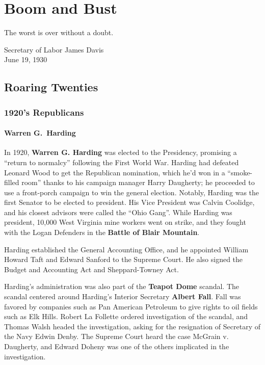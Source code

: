 \chapter{Boom and Bust}

\epigraph{%
  The worst is over without a doubt.
}{Secretary of Labor James Davis \\ June 19, 1930}

\section{Roaring Twenties}

\subsection*{1920's Republicans}

\subsubsection*{Warren G.\ Harding}

In 1920, \textbf{Warren G. Harding} was elected to the Presidency,
promising a ``return to normalcy'' following the First World War.
Harding had defeated Leonard Wood to get the Republican nomination,
which he'd won in a ``smoke-filled room'' thanks to his campaign manager Harry Daugherty;
he proceeded to use a front-porch campaign to win the general election.
Notably, Harding was the first Senator to be elected to president.
His Vice President was Calvin Coolidge, and his closest advisors were called the ``Ohio Gang''.
While Harding was president, 10,000 West Virginia mine workers went on strike,
and they fought with the Logan Defenders in the \textbf{Battle of Blair Mountain}.

Harding established the General Accounting Office,
and he appointed William Howard Taft and Edward Sanford to the Supreme Court.
He also signed the Budget and Accounting Act and Sheppard-Towney Act.

Harding's administration was also part of the \textbf{Teapot Dome} scandal.
The scandal centered around Harding's Interior Secretary \textbf{Albert Fall}.
Fall was favored by companies such as Pan American Petroleum to give rights to oil fields such as Elk Hills.
Robert La Follette ordered investigation of the scandal,
and Thomas Walsh headed the investigation, asking for the resignation of Secretary of the Navy Edwin Denby.
The Supreme Court heard the case McGrain v. Daugherty,
and Edward Doheny was one of the others implicated in the investigation.


